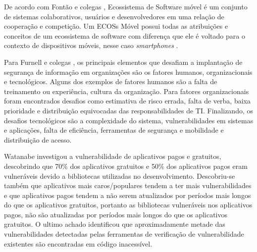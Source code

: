 De acordo com Fontão e colegas \cite{fontao}, Ecossistema de Software móvel é um conjunto de sistemas colaborativos, usuários e desenvolvedores em uma relação de cooperação e competição. Um ECOSs Móvel possui todas as atribuições e conceitos de um ecossistema de software com diferença que ele é voltado para o contexto de dispositivos móveis, nesse caso \textit{smartphones} \cite{mestradoCaio}.

Para Furnell e colegas \cite{furnell2009integrated}, os principais elementos que desafiam a implantação de segurança de informação em organizações são os fatores humanos, organizacionais e tecnológicos. Alguns dos exemplos de fatores humanos são a falta de treinamento ou experiência, cultura da organização. Para fatores organizacionais foram encontrados desafios como estimativa de risco errada, falta de verba, baixa prioridade e distribuição equivocadas das responsabilidades de TI. Finalizando, os desafios tecnológicos são a complexidade do sistema, vulnerabilidades em sistemas e aplicações, falta de eficiência, ferramentas de segurança e mobilidade e distribuição de acesso.

Watanabe \cite{watanabe2017understanding} investigou a vulnerabilidade de aplicativos pagos e gratuitos, descobrindo que 70{\%} dos aplicativos gratuitos e 50{\%} dos aplicativos pagos eram vulneráveis devido a bibliotecas utilizadas no desenvolvimento. Descobriu-se também que aplicativos mais caros/populares tendem a ter mais vulnerabilidades e que aplicativos pagos tendem a não serem atualizados por períodos mais longos do que os aplicativos gratuitos, portanto as bibliotecas vulneráveis nos aplicativos pagos, não são atualizadas por períodos mais longos do que os aplicativos gratuitos.  O ultimo achado identificou que aproximadamente metade das vulnerabilidades detectadas pelas ferramentas de verificação de vulnerabilidade existentes são encontradas em código inacessível.

